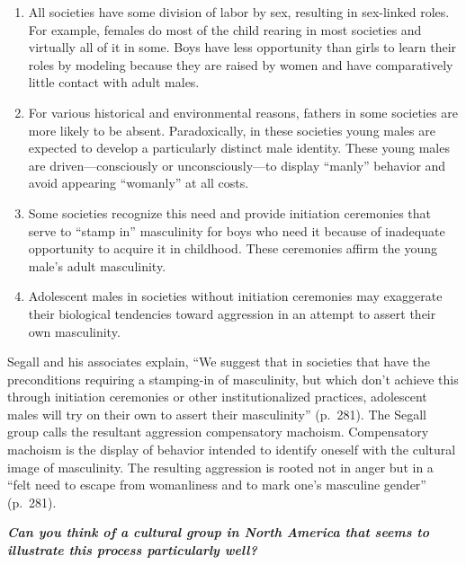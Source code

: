 \documentclass[
]{book}
\providecommand{\tightlist}{%
  \setlength{\itemsep}{0pt}\setlength{\parskip}{0pt}}
\begin{document}
\begin{enumerate}
\def\labelenumi{\arabic{enumi}.}
\tightlist
\item
  All societies have some division of labor by sex, resulting in sex-linked roles. For example, females do most of the child rearing in most societies and virtually all of it in some. Boys have less opportunity than girls to learn their roles by modeling because they are raised by women and have comparatively little contact with adult males.\\
\item
  For various historical and environmental reasons, fathers in some societies are more likely to be absent. Paradoxically, in these societies young males are expected to develop a particularly distinct male identity. These young males are driven---consciously or unconsciously---to display ``manly'' behavior and avoid appearing ``womanly'' at all costs.\\
\item
  Some societies recognize this need and provide initiation ceremonies that serve to ``stamp in'' masculinity for boys who need it because of inadequate opportunity to acquire it in childhood. These ceremonies affirm the young male's adult masculinity.\\
\item
  Adolescent males in societies without initiation ceremonies may exaggerate their biological tendencies toward aggression in an attempt to assert their own masculinity.
\end{enumerate}

Segall and his associates explain, ``We suggest that in societies that have the preconditions requiring a stamping-in of masculinity, but which don't achieve this through initiation ceremonies or other institutionalized practices, adolescent males will try on their own to assert their masculinity'' (p.~281). The Segall group calls the resultant aggression compensatory machoism. Compensatory machoism is the display of behavior intended to identify oneself with the cultural image of masculinity. The resulting aggression is rooted not in anger but in a ``felt need to escape from womanliness and to mark one's masculine gender'' (p.~281).

\begin{caution}
\textbf{\emph{Can you think of a cultural group in North America that seems to illustrate this process particularly well?}}
\end{caution}
\end{document}

